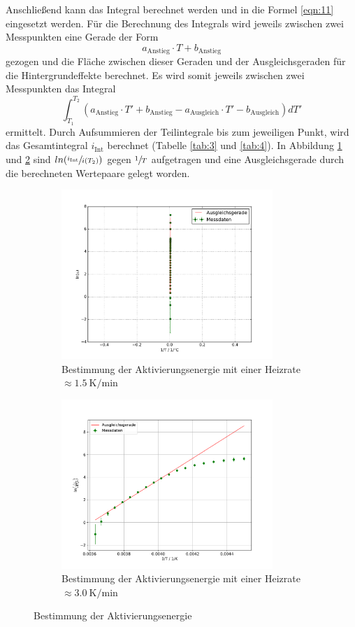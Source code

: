 Anschließend kann das Integral berechnet werden und in die Formel
\ref{eqn:11}
eingesetzt werden.
Für die Berechnung des Integrals wird jeweils zwischen zwei Messpunkten
eine Gerade der Form
\begin{equation*}
  a_\text{Anstieg} \cdot T + b_\text{Anstieg}
\end{equation*}
gezogen und
die Fläche zwischen dieser Geraden und der Ausgleichsgeraden für die
Hintergrundeffekte berechnet.
Es wird somit jeweils zwischen zwei Messpunkten das Integral
\begin{equation}
  \int^{T_2}_{T_1} \left(a_\text{Anstieg} \cdot T' + b_\text{Anstieg}
  -  a_\text{Ausgleich} \cdot T' -  b_\text{Ausgleich} \right) dT'
  \label{eqn:int}
\end{equation}
ermittelt. Durch Aufsummieren der Teilintegrale bis zum jeweiligen Punkt, wird
das Gesamtintegral $i_\text{Int}$ berechnet (Tabelle \ref{tab:3} und \ref{tab:4}).
In Abbildung \ref{fig:int_1} und \ref{fig:int_2} sind $ln(\sfrac{i_\text{Int}}{i(T_2)})$  gegen $\sfrac{1}{T}$
aufgetragen und eine Ausgleichsgerade durch
die berechneten Wertepaare gelegt worden.
\begin{figure}[H]
\centering
\begin{subfigure}{0.49\textwidth}
\centering
\includegraphics[width=8.0cm]{int_1.pdf}
\caption{Bestimmung der Aktivierungsenergie mit einer Heizrate
$\approx \SI{1.5}{\kelvin\per\minute}$}
\label{fig:int_1}
\end{subfigure}
\begin{subfigure}{0.49\textwidth}
\centering
\includegraphics[width=8.0cm]{int_2.pdf}
\caption{Bestimmung der Aktivierungsenergie mit einer Heizrate
$\approx \SI{3.0}{\kelvin\per\minute}$}
\label{fig:int_2}
\end{subfigure}
\caption{Bestimmung der Aktivierungsenergie}
\label{abb:int_ges}
\end{figure}
